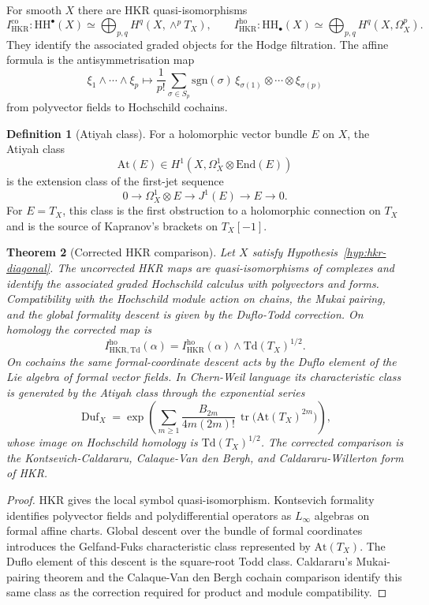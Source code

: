 \documentclass[11pt]{amsart}
\newtheorem{theorem}{Theorem}[section]
\theoremstyle{definition}
\newtheorem{definition}[theorem]{Definition}
\theoremstyle{remark}
\providecommand{\At}{\mathrm{At}}
\providecommand{\End}{\mathrm{End}}
\providecommand{\HH}{\mathrm{HH}}
\providecommand{\HKR}{\mathrm{HKR}}
\providecommand{\Td}{\mathrm{Td}}
\begin{document}
For smooth $X$ there are HKR quasi-isomorphisms
\[
  I_{\HKR}^{\mathrm{co}}\colon \HH^\bullet(X)\simeq
  \bigoplus_{p,q}H^q(X,\wedge^pT_X),
  \qquad
  I_{\HKR}^{\mathrm{ho}}\colon \HH_\bullet(X)\simeq
  \bigoplus_{p,q}H^q(X,\Omega^p_X).
\]
They identify the associated graded objects for the Hodge filtration.
The affine formula is the antisymmetrisation map
\[
  \xi_1\wedge\cdots\wedge\xi_p
  \longmapsto
  \frac{1}{p!}\sum_{\sigma\in S_p}\mathrm{sgn}(\sigma)\,
  \xi_{\sigma(1)}\otimes\cdots\otimes\xi_{\sigma(p)}
\]
from polyvector fields to Hochschild cochains.

\begin{definition}[Atiyah class]
\label{def:atiyah-class}
For a holomorphic vector bundle $E$ on $X$, the Atiyah class
\[
  \At(E)\in H^1(X,\Omega^1_X\otimes\End(E))
\]
is the extension class of the first-jet sequence
\[
  0\to\Omega^1_X\otimes E\to J^1(E)\to E\to0.
\]
For $E=T_X$, this class is the first obstruction to a holomorphic
connection on $T_X$ and is the source of Kapranov's brackets on
$T_X[-1]$.
\end{definition}

\begin{theorem}[Corrected HKR comparison]
\label{thm:corrected-hkr}
Let $X$ satisfy Hypothesis~\ref{hyp:hkr-diagonal}. The uncorrected HKR
maps are quasi-isomorphisms of complexes and identify the associated
graded Hochschild calculus with polyvectors and forms. Compatibility
with the Hochschild module action on chains, the Mukai pairing, and the
global formality descent is given by the Duflo-Todd correction. On
homology the corrected map is
\[
  I_{\HKR,\Td}^{\mathrm{ho}}(\alpha)
  =
  I_{\HKR}^{\mathrm{ho}}(\alpha)\wedge \Td(T_X)^{1/2}.
\]
On cochains the same formal-coordinate descent acts by the Duflo
element of the Lie algebra of formal vector fields. In Chern-Weil
language its characteristic class is generated by the Atiyah class
through the exponential series
\[
  \operatorname{Duf}_X
  =
  \exp\!\left(
    \sum_{m\ge1}
    \frac{B_{2m}}{4m(2m)!}\,
    \operatorname{tr}\bigl(\At(T_X)^{2m}\bigr)
  \right),
\]
whose image on Hochschild homology is $\Td(T_X)^{1/2}$.
The corrected comparison is the Kontsevich-Caldararu, Calaque-Van den
Bergh, and Caldararu-Willerton form of HKR.
\end{theorem}

\begin{proof}
HKR gives the local symbol quasi-isomorphism. Kontsevich formality
identifies polyvector fields and polydifferential operators as
$L_\infty$ algebras on formal affine charts. Global descent over the
bundle of formal coordinates introduces the Gelfand-Fuks characteristic
class represented by $\At(T_X)$. The Duflo element of this descent is
the square-root Todd class. Caldararu's Mukai-pairing theorem and the
Calaque-Van den Bergh cochain comparison identify this same class as
the correction required for product and module compatibility.
\end{proof}
\end{document}
